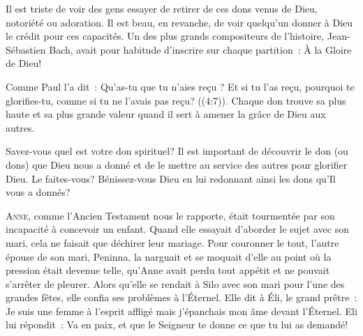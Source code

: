 
Il est triste de voir des gens essayer de retirer de ces dons venus de Dieu,
 notoriété ou adoration. Il est beau, en revanche, de voir quelqu'un donner
 à Dieu le crédit pour ces capacités.
 Un des plus grands compositeurs de l'histoire, Jean-Sébastien Bach,
 avait pour habitude d'inscrire sur chaque partition~: 
 \og À la Gloire de Dieu! \fg{}

Comme Paul l'a dit~: 
 \og Qu'as-tu que tu n'aies reçu ? Et si tu l'as reçu,
 pourquoi te glorifies-tu, comme si tu ne l'avais pas reçu?
 ((4:7)).
 Chaque don trouve sa plus haute et sa plus grande valeur
 quand il sert à amener la grâce de Dieu aux autres.

Savez-vous quel est votre don spirituel? Il est important de découvrir le don
 (ou dons) que Dieu nous a donné et de le mettre au service des autres
 pour glorifier Dieu. Le faites-vous? Bénissez-vous Dieu en lui redonnant
 ainsi les dons qu'Il vous a donnés?

\dvrule






\lettrine{A}{nne,} comme l'Ancien Testament nous le rapporte,
 était tourmentée par son incapacité à concevoir un enfant.
 Quand elle essayait d'aborder le sujet avec son mari,
 cela ne faisait que déchirer leur mariage. Pour couronner le tout,
 l'autre épouse de son mari, Peninna, la narguait et se moquait d'elle
 au point où la pression était devenue telle, qu'Anne avait perdu
 tout appétit et ne pouvait s'arrêter de pleurer.
 Alors qu'elle se rendait à Silo avec son mari pour l'une des grandes fêtes,
 elle confia ses problèmes à l'Éternel.
 Elle dit à Éli, le grand prêtre~: 
 \og Je suis une femme à l'esprit affligé mais j'épanchais mon âme
 devant l'Éternel. \fg{}
 Eli lui répondit~: 
 \og Va en paix, et que le Seigneur te donne ce que tu lui as demandé! \fg{}

